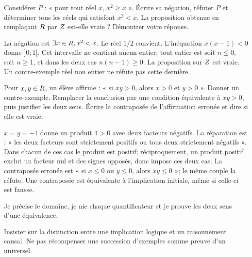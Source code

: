 \label{t11s-c06-p01}
Considérer $P$ : « pour tout réel $x$, $x^2\ge x$ ». Écrire sa négation, réfuter $P$ et déterminer tous les réels qui satisfont $x^2<x$. La proposition obtenue en remplaçant $R$ par $Z$ est-elle vraie ? Démontrer votre réponse.
\begin{corrige}\label{sol-t11s-c06-p01}
La négation est $\exists x\in R,x^2<x$. Le réel $1/2$ convient. L’inéquation $x(x-1)<0$ donne $]0;1[$. Cet intervalle ne contient aucun entier; tout entier est soit $n\le0$, soit $n\ge1$, et dans les deux cas $n(n-1)\ge0$. La proposition sur $Z$ est vraie. Un contre-exemple réel non entier ne réfute pas cette dernière.
\end{corrige}
\label{t11s-c06-p02}
Pour $x,y\in R$, un élève affirme : « si $xy>0$, alors $x>0$ et $y>0$ ». Donner un contre-exemple. Remplacer la conclusion par une condition équivalente à $xy>0$, puis justifier les deux sens. Écrire la contraposée de l’affirmation erronée et dire si elle est vraie.
\begin{corrige}\label{sol-t11s-c06-p02}
$x=y=-1$ donne un produit $1>0$ avec deux facteurs négatifs. La réparation est : « les deux facteurs sont strictement positifs ou tous deux strictement négatifs ». Dans chacun de ces cas le produit est positif; réciproquement, un produit positif exclut un facteur nul et des signes opposés, donc impose ces deux cas. La contraposée erronée est « si $x\le0$ ou $y\le0$, alors $xy\le0$ »; le même couple la réfute. Une contraposée est équivalente à l’implication initiale, même si celle-ci est fausse.
\end{corrige}

\begin{jemeteste}Je précise le domaine, je nie chaque quantificateur et je prouve les deux sens d’une équivalence.\end{jemeteste}
\begin{notepourlaclasse}Insister sur la distinction entre une implication logique et un raisonnement causal. Ne pas récompenser une succession d’exemples comme preuve d’un universel.\end{notepourlaclasse}
